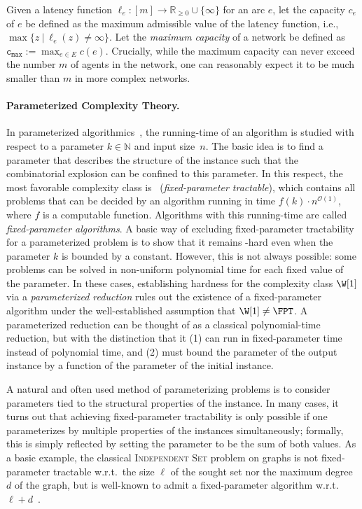 \documentclass[letterpaper]{article} %
\newcommand{\bigoh}{\ensuremath{{\mathcal O}}}
\newcommand{\cmax}{\mathtt{c_{max}}}
\begin{document}
Given a latency function $\ell_e: [m] \rightarrow \mathbb{R}_{\geq 0}\cup\{\infty\}$ for an arc $e$, let the capacity $c_e$ of $e$ be defined as the maximum admissible value of the latency function, i.e.,~$\max\{z~|~\ell_e(z)\neq \infty\}$. Let the \emph{maximum capacity} of a network be defined as $\cmax:=\max_{e\in E}c(e)$. Crucially, while the maximum capacity can never exceed the number $m$ of agents in the network, one can reasonably expect it to be much smaller than $m$ in more complex networks.

\paragraph{Parameterized Complexity Theory.}
In parameterized algorithmics~\cite{CyganFKLMPPS15,DowneyF13,Niedermeier06}, the
running-time of an algorithm is studied with respect to a parameter
$k\in\mathbb{N}$ and input size~$n$. The basic idea is to find a parameter
that describes the structure of the instance such that the
combinatorial explosion can be confined to this parameter. In this
respect, the most favorable complexity class is \FPT\
(\textit{fixed-parameter tractable}), which contains all problems that
can be decided by an algorithm running in time $f(k)\cdot
n^{\bigoh(1)}$, where $f$ is a computable function. Algorithms with
this running-time are called \emph{fixed-parameter algorithms}. 
A basic way of excluding fixed-parameter tractability for a parameterized problem is to show that it remains \NP-hard even when the parameter $k$ is bounded by a constant. However, this is not always possible: some problems can be solved in non-uniform polynomial time for each fixed value of the parameter. In these cases, establishing hardness for the complexity class $\W[1]$ via a \emph{parameterized reduction} rules out the existence of a fixed-parameter algorithm under the well-established assumption that $\W[1]\neq \FPT$. A parameterized reduction can be thought of as a classical polynomial-time reduction, but with the distinction that it (1) can run in fixed-parameter time instead of polynomial time, and (2) must bound the parameter of the output instance by a function of the parameter of the initial instance.

A natural and often used method of parameterizing problems is to consider parameters tied to the structural properties of the instance. In many cases, it turns out that achieving fixed-parameter tractability is only possible if one parameterizes by multiple properties of the instances simultaneously; formally, this is simply reflected by setting the parameter to be the sum of both values. As a basic example, the classical \textsc{Independent Set} problem on graphs is not fixed-parameter tractable w.r.t.\ the size $\ell$ of the sought set nor the maximum degree $d$ of the graph, but is well-known to admit a fixed-parameter algorithm w.r.t.\ $\ell+d$~\cite{CyganFKLMPPS15}.
\end{document}
